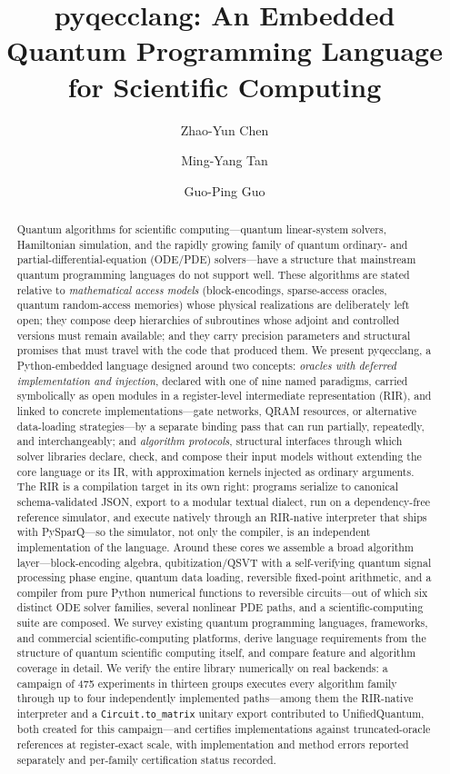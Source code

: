 \documentclass[a4paper,onecolumn,11pt,unpublished]{quantumarticle}
\title{pyqecclang: An Embedded Quantum Programming Language for Scientific Computing}
\author{Zhao-Yun Chen}
\affiliation{Institute of Artificial Intelligence, Hefei Comprehensive National Science Center, Hefei, Anhui, 230088, China}
\author{Ming-Yang Tan}
\affiliation{University of Science and Technology of China, Hefei, Anhui, 230088, China}
\author{Guo-Ping Guo}
\affiliation{University of Science and Technology of China, Hefei, Anhui, 230088, China}
\newcommand{\pqlang}{pyqecclang\xspace}
\begin{document}
\begin{abstract}
Quantum algorithms for scientific computing---quantum linear-system solvers, Hamiltonian simulation, and the rapidly growing family of quantum ordinary- and partial-differential-equation (ODE/PDE) solvers---have a structure that mainstream quantum programming languages do not support well.
These algorithms are stated relative to \emph{mathematical access models} (block-encodings, sparse-access oracles, quantum random-access memories) whose physical realizations are deliberately left open; they compose deep hierarchies of subroutines whose adjoint and controlled versions must remain available; and they carry precision parameters and structural promises that must travel with the code that produced them.
We present \pqlang, a Python-embedded language designed around two concepts: \emph{oracles with deferred implementation and injection}, declared with one of nine named paradigms, carried symbolically as open modules in a register-level intermediate representation (RIR), and linked to concrete implementations---gate networks, QRAM resources, or alternative data-loading strategies---by a separate binding pass that can run partially, repeatedly, and interchangeably; and \emph{algorithm protocols}, structural interfaces through which solver libraries declare, check, and compose their input models without extending the core language or its IR, with approximation kernels injected as ordinary arguments.
The RIR is a compilation target in its own right: programs serialize to canonical schema-validated JSON, export to a modular textual dialect, run on a dependency-free reference simulator, and execute natively through an RIR-native interpreter that ships with PySparQ---so the simulator, not only the compiler, is an independent implementation of the language.
Around these cores we assemble a broad algorithm layer---block-encoding algebra, qubitization/QSVT with a self-verifying quantum signal processing phase engine, quantum data loading, reversible fixed-point arithmetic, and a compiler from pure Python numerical functions to reversible circuits---out of which six distinct ODE solver families, several nonlinear PDE paths, and a scientific-computing suite are composed.
We survey existing quantum programming languages, frameworks, and commercial scientific-computing platforms, derive language requirements from the structure of quantum scientific computing itself, and compare feature and algorithm coverage in detail.
We verify the entire library numerically on real backends: a campaign of 475 experiments in thirteen groups executes every algorithm family through up to four independently implemented paths---among them the RIR-native interpreter and a \texttt{Circuit.to\_matrix} unitary export contributed to UnifiedQuantum, both created for this campaign---and certifies implementations against truncated-oracle references at register-exact scale, with implementation and method errors reported separately and per-family certification status recorded.

\end{abstract}
\end{document}
